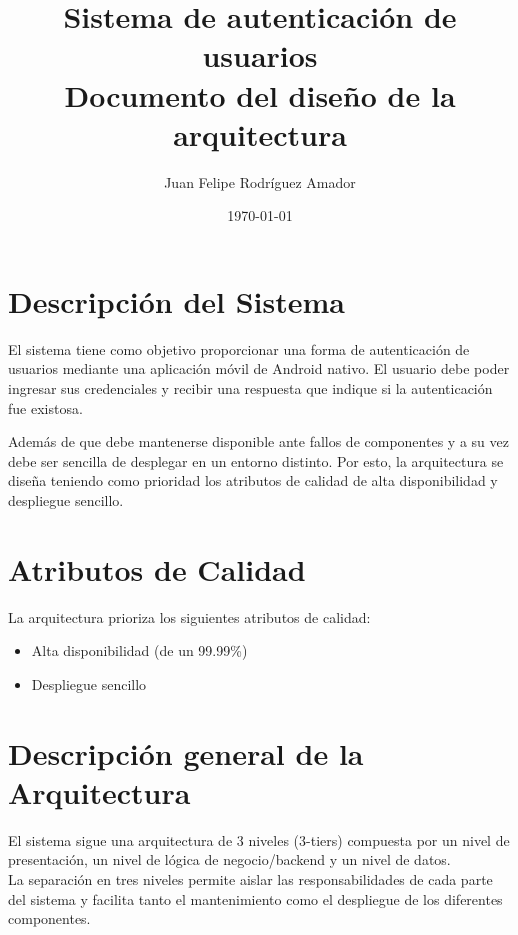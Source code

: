 \documentclass[12pt,a4paper]{article}
\title{
  \textbf{Sistema de autenticación de usuarios}\\
  \large Documento del diseño de la arquitectura
}
\author{
  Juan Felipe Rodríguez Amador
}
\date{\today}
\begin{document}
\maketitle


\tableofcontents
\newpage

\section{Descripción del Sistema}

El sistema tiene como objetivo proporcionar una forma de
autenticación de usuarios mediante una aplicación móvil de Android
nativo. El usuario debe poder ingresar sus credenciales y recibir una
respuesta que indique si la autenticación fue existosa.

Además de que debe mantenerse disponible ante fallos de componentes y
a su vez debe ser sencilla de desplegar en un entorno distinto. Por
esto, la arquitectura se diseña teniendo como prioridad los atributos
de calidad de alta disponibilidad y despliegue sencillo.

\section{Atributos de Calidad}

La arquitectura prioriza los siguientes atributos de calidad:

\begin{itemize}
  \item Alta disponibilidad (de un 99.99\%)
  \item Despliegue sencillo
\end{itemize}

\section{Descripción general de la Arquitectura}

El sistema sigue una arquitectura de 3 niveles (3-tiers) compuesta
por un nivel de presentación, un nivel de lógica de negocio/backend y
un nivel de datos. \\
La separación en tres niveles permite aislar las responsabilidades de
cada parte del sistema y facilita tanto el mantenimiento como el
despliegue de los diferentes componentes.
\end{document}
